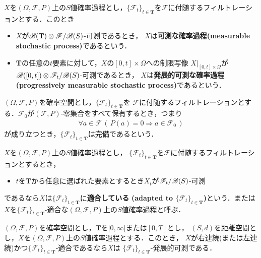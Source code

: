 	$X$を$(\Omega,\mathscr{F},P)$上の$S$値確率過程とし，$\{\mathscr{F}_t\}_{t \in \mathbf{T}}$を$\mathscr{F}$に付随するフィルトレーションとする．このとき
	\begin{itemize}
		\item $X$が$\mathscr{B}(\mathbf{T}) \otimes \mathscr{F}/\mathscr{B}(S)$-可測であるとき，
			$X$は{\bf 可測な確率過程}{\bf (measurable stochastic process)}であるという．
		\item $\mathbf{T}$の任意の$t$要素に対して，$X$の$[0,t] \times \Omega$への制限写像
			$X|_{[0,t] \times \Omega}$が$\mathscr{B}([0,t]) \otimes \mathscr{F}_t/\mathscr{B}(S)$-可測であるとき，
			$X$は{\bf 発展的可測な確率過程}{\bf (progressively measurable stochastic process)}であるという．
	\end{itemize}
	
	\begin{screen}
		\begin{dfn}[フィルトレーションの完備性]\label{thm:completeness_of_filtration}
			$(\Omega,\mathscr{F},P)$を確率空間とし，$\{\mathscr{F}_t\}_{t \in \mathbf{T}}$を
			$\mathscr{F}$に付随するフィルトレーションとする．$\mathscr{F}_{0}$が$(\mathscr{F},P)$-零集合をすべて保有するとき，つまり
			\begin{align}
				\forall a \in \mathscr{F}\, \left(\, P(a) = 0 \Longrightarrow a \in \mathscr{F}_{0}\, \right)
			\end{align}
			が成り立つとき，$\{\mathscr{F}_t\}_{t \in \mathbf{T}}$は完備であるという．
		\end{dfn}
	\end{screen}
	
	\begin{screen}
		\begin{dfn}[適合]
			$X$を$(\Omega,\mathscr{F},P)$上の$S$値確率過程とし，
			$\{\mathscr{F}_t\}_{t \in \mathbf{T}}$を$\mathscr{F}$に付随するフィルトレーションとするとき，
			\begin{itemize}
				\item $t$を$\mathbf{T}$から任意に選ばれた要素とするとき$X_t$が$\mathscr{F}_t/\mathscr{B}(S)$-可測
			\end{itemize}
			であるなら$X$は$\{\mathscr{F}_t\}_{t \in \mathbf{T}}$に{\bf 適合している}
			{\bf (adapted to $\{\mathscr{F}_t\}_{t \in \mathbf{T}}$)}という．または
			$X$を$\{\mathscr{F}_t\}_{t \in \mathbf{T}}$-適合な$(\Omega,\mathscr{F},P)$上の$S$値確率過程と呼ぶ．
		\end{dfn}
	\end{screen}
	
	\begin{screen}
		\begin{thm}[右連続または左連続な適合過程は発展的可測]
			$(\Omega,\mathscr{F},P)$を確率空間とし，$\mathbf{T}$を$[0,\infty[$または$[0,T]$とし，
			$(S,d)$を距離空間とし，$X$を$(\Omega,\mathscr{F},P)$上の$S$値確率過程とする．このとき，
			$X$が右連続(または左連続)かつ$\{\mathscr{F}_t\}_{t \in \mathbf{T}}$-適合であるなら$X$は
			$\{\mathscr{F}_t\}_{t \in \mathbf{T}}$-発展的可測である．
		\end{thm}
	\end{screen}
	
